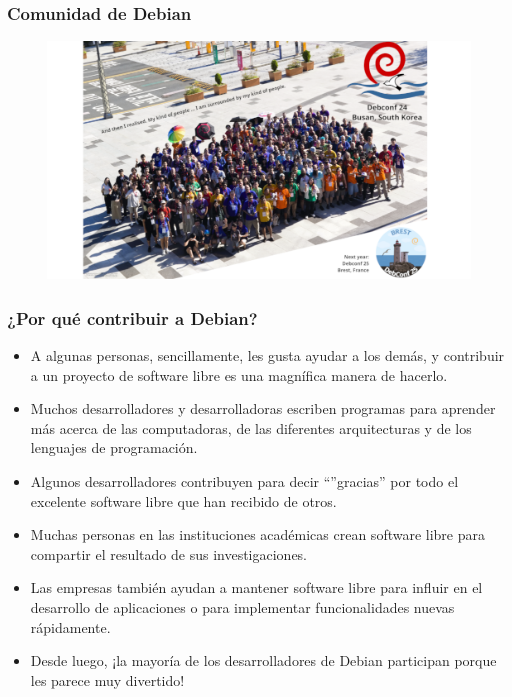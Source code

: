 \documentclass{beamer}
\begin{document}
\begin{frame}
  \frametitle{Comunidad de Debian}
	\begin{figure}
		\centering
		\includegraphics[width=0.7\linewidth]{images/debconf.png}
		\label{fig:comunidad de Debian}
	\end{figure}
\end{frame}

\begin{frame}%
  \frametitle{¿Por qué contribuir a Debian?}
  \begin{itemize}
    \item A algunas personas, sencillamente, les gusta ayudar a los demás, y
      contribuir a un proyecto de software libre es una magnífica manera de
      hacerlo. \pause
    \item Muchos desarrolladores y desarrolladoras escriben programas para
      aprender más acerca de las computadoras, de las diferentes arquitecturas y
      de los lenguajes de programación. \pause
    \item Algunos desarrolladores contribuyen para decir ``''gracias'' por todo
      el excelente software libre que han recibido de otros. \pause
    \item Muchas personas en las instituciones académicas crean software libre
      para compartir el resultado de sus investigaciones. \pause
    \item Las empresas también ayudan a mantener software libre para influir en
      el desarrollo de aplicaciones o para implementar funcionalidades nuevas
      rápidamente. \pause
    \item Desde luego, ¡la mayoría de los desarrolladores de Debian participan
      porque les parece muy divertido!
  \end{itemize}
\end{frame}
\end{document}
